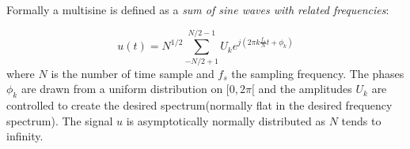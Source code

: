 Formally a multisine is defined as a \textit{sum of sine waves with related
  frequencies}\autocite{overschee1996a}:

\begin{equation}
  \label{eq:multisine}
  u(t) = N^{1/2} \sum_{-N/2+1}^{N/2-1} U_k e^{j \left( 2\pi k \frac{f_s}{N}t + \phi_k \right)}
\end{equation}
where $N$ is the number of time sample and $f_s$ the sampling frequency. The
phases $\phi_k$ are drawn from a uniform distribution on $[0, 2\pi[$ and the
amplitudes $U_k$ are controlled to create the desired spectrum(normally flat in
the desired frequency spectrum). The signal $u$ is asymptotically normally
distributed as $N$ tends to infinity.


